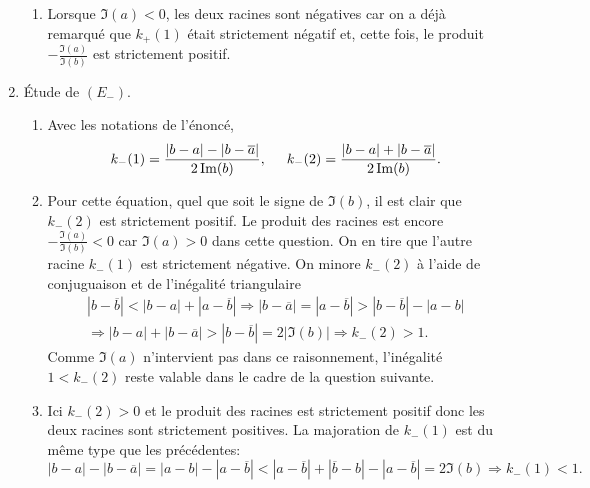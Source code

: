 \begin{enumerate}
\begin{enumerate}
  \item Lorsque $\Im(a)<0$, les deux racines sont négatives car on a déjà remarqué que $k_+(1)$ était strictement négatif et, cette fois, le produit $-\frac{\Im(a)}{\Im(b)}$ est strictement positif.
\end{enumerate}

  \item  \'Etude de $(E_-)$.
\begin{enumerate}
  \item  Avec les notations de l'énoncé,
\begin{displaymath}
  k_-(1) = \frac{|b-a|-|b-\overline{a}|}{2\Im(b)}, \hspace{0.5cm}   k_-(2) = \frac{|b-a|+|b-\overline{a}|}{2\Im(b)}.
\end{displaymath}

  \item Pour cette équation, quel que soit le signe de $\Im(b)$, il est clair que $k_-(2)$ est strictement positif.\newline
  Le produit des racines est encore $-\frac{\Im(a)}{\Im(b)}<0$ car $\Im(a)>0$ dans cette question. On en tire que l'autre racine $k_-(1)$ est strictement négative.\newline
  On minore $k_-(2)$ à l'aide de conjuguaison et de l'inégalité triangulaire
\begin{multline*}
|b-\overline{b}|<|b-a|+|a-\overline{b}| \Rightarrow
  |b-\overline{a}| = |a-\overline{b}|> |b-\overline{b}| -|a-b|\\
  \Rightarrow |b-a|+|b-\overline{a}|> |b-\overline{b}| = 2 |\Im(b)|
  \Rightarrow k_-(2) > 1 . 
\end{multline*}
Comme $\Im(a)$ n'intervient pas dans ce raisonnement, l'inégalité $1<k_-(2)$ reste valable dans le cadre de la question suivante.
  \item Ici $k_-(2)>0$ et le produit des racines est strictement positif donc les deux racines sont strictement positives.\newline
  La majoration de $k_-(1)$ est du même type que les précédentes:
\begin{displaymath}
|b-a|-|b-\overline{a}| = |a-b|-|a-\overline{b}| < |a-\overline{b}|+|\overline{b}-b|-|a-\overline{b}| = 2\Im(b)
\Rightarrow k_-(1) < 1 .
\end{displaymath}
\end{enumerate}
\end{enumerate}

